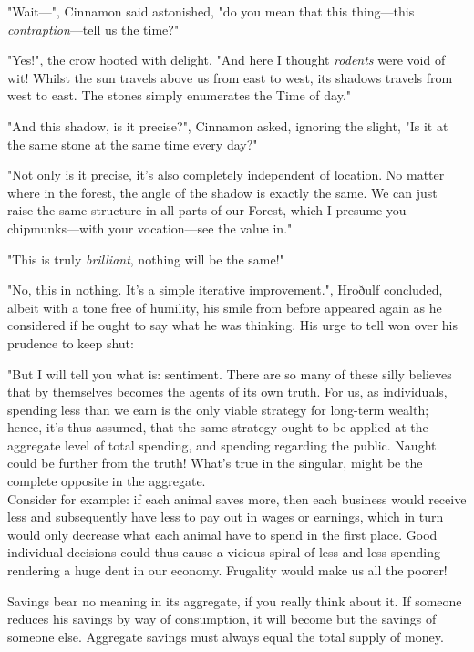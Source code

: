 "Wait---", Cinnamon said astonished, "do you mean that this thing---this \textit{contraption}---tell us the time?"

"Yes!", the crow hooted with delight, "And here I thought \textit{rodents} were void of wit! Whilst the sun travels above us from east to west, its shadows travels from west to east. The stones simply enumerates the Time of day."

"And this shadow, is it precise?", Cinnamon asked, ignoring the slight, "Is it at the same stone at the same time every day?"

"Not only is it precise, it's also completely independent of location. No matter where in the forest, the angle of the shadow is exactly the same. We can just raise the same structure in all parts of our Forest, which I presume you chipmunks---with your vocation---see the value in."

"This is truly \textit{brilliant}, nothing will be the same!"

"No, this in nothing. It's a simple iterative improvement.", Hroðulf concluded, albeit with a tone free of humility, his smile from before appeared again as he considered if he ought to say what he was thinking. His urge to tell won over his prudence to keep shut: 

"But I will tell you what is: sentiment. There are so many of these silly believes that by themselves becomes the agents of its own truth. For us, as individuals, spending less than we earn is the only viable strategy for long-term wealth; hence, it's thus assumed, that the same strategy ought to be applied at the aggregate level of total spending, and spending regarding the public. Naught could be further from the truth! What's true in the singular, might be the complete opposite in the aggregate.\\

Consider for example: if each animal saves more, then each business would receive less and subsequently have less to pay out in wages or earnings, which in turn would only decrease what each animal have to spend in the first place. Good individual decisions could thus cause a vicious spiral of less and less spending rendering a huge dent in our economy. Frugality would make us all the poorer! 

Savings bear no meaning in its aggregate, if you really think about it. If someone reduces his savings by way of consumption, it will become but the savings of someone else. Aggregate savings must always equal the total supply of money.\\

